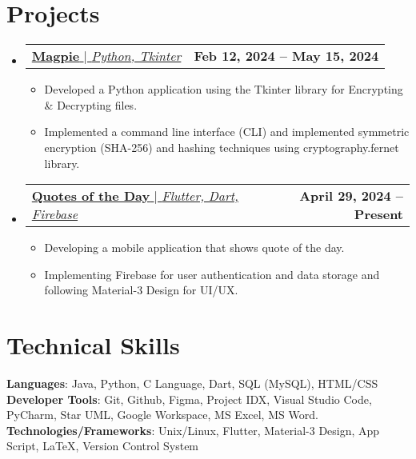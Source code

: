 \documentclass[a4paper,11pt]{article}
\makeatletter
\newcommand{\resumeItem}[1]{
  \item\small{
    {#1 \vspace{-2pt}}
  }
}
\newcommand{\resumeProjectHeading}[2]{
    \item
    \begin{tabular*}{0.97\textwidth}{l@{\extracolsep{\fill}}r}
      \small#1 & \textbf{\small #2} \\
    \end{tabular*}\vspace{-7pt}
}
\newcommand{\resumeSubHeadingListStart}{\begin{itemize}[leftmargin=0.15in, label={}]}
\newcommand{\resumeSubHeadingListEnd}{\end{itemize}}
\newcommand{\resumeItemListStart}{\begin{itemize}}
\newcommand{\resumeItemListEnd}{\end{itemize}\vspace{-5pt}}
\makeatother
\begin{document}
\section{Projects}
    \resumeSubHeadingListStart
      \resumeProjectHeading
          {\href{https://github.com/srinu2003/Magpie}{{\textbf{Magpie}} $|$ \emph{Python, Tkinter}}}{Feb 12, 2024 -- May 15, 2024}
          \resumeItemListStart \vspace{0pt}
          \resumeItem{Developed a Python application using the Tkinter library for Encrypting \& Decrypting files.}
          \resumeItem{Implemented a command line interface (CLI) and implemented symmetric encryption (SHA-256) and hashing techniques using cryptography.fernet library.}
          \resumeItemListEnd
      \resumeProjectHeading
        {\href{https://github.com/srinu2003/quote_of_the_day}{{\textbf{Quotes of the Day}} $|$ \emph{Flutter, Dart, Firebase}}}{April 29, 2024 -- Present}
        \resumeItemListStart
          \resumeItem{Developing a mobile application that shows quote of the day.}
          \resumeItem{Implementing Firebase for user authentication and data storage and following Material-3 Design for UI/UX.}
        \resumeItemListEnd
    \resumeSubHeadingListEnd



\section{Technical Skills}
 \begin{itemize}[leftmargin=0.15in, label={}]
    \small{\item{
     \textbf{Languages}{: Java, Python, C Language, Dart, SQL (MySQL), HTML/CSS} \\
     \textbf{Developer Tools}{: Git, Github, Figma, Project IDX, Visual Studio Code, PyCharm, Star UML, Google Workspace, MS Excel, MS Word.} \\
     \textbf{Technologies/Frameworks}{: Unix/Linux, Flutter, Material-3 Design, App Script, \LaTeX, Version Control System} \\
    }}
 \end{itemize}

\vspace{-12pt}
\end{document}
